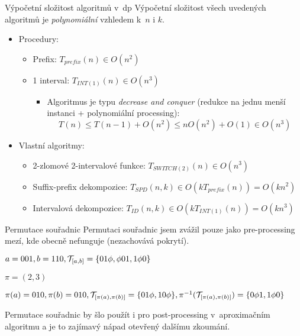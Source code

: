\documentclass{beamer}
\theoremstyle{remark}
\begin{document}
\begin{frame}{Výpočetní složitost algoritmů v~\acrshort{dp}}
Výpočetní složitost všech uvedených algoritmů je \emph{polynomiální} vzhledem k~$n$ i $k$.

\begin{itemize}
\item Procedury:
\begin{itemize}
\item Prefix: $T_{prefix}(n) \in O(n^2)$
\item 1 interval: $T_{INT(1)}(n) \in O(n^3)$
\begin{itemize}
\item
Algoritmus je typu \emph{decrease and conquer} (redukce na jednu menší instanci + polynomiální processing):
$$T(n) \leq T(n-1) + O(n^2) \leq n O(n^2) + O(1) \in O(n^{3})$$
\end{itemize}
\end{itemize}
\item Vlastní algoritmy:
\begin{itemize}
\item 2-zlomové 2-intervalové funkce: $T_{SWITCH(2)}(n) \in O(n^3)$
\item Suffix-prefix dekompozice: $T_{SPD}(n, k) \in O(k T_{prefix}(n)) = O(kn^2)$
\item Intervalová dekompozice: $T_{ID}(n, k) \in O(k T_{INT(1)}(n)) = O(k n^3)$
\end{itemize}
\end{itemize}

\end{frame}


\begin{frame}{Permutace souřadnic}
Permutaci souřadnic jsem zvážil pouze jako pre-processing mezí, kde obecně nefunguje (nezachovává pokrytí).

\begin{example}
$a = 001, b = 110, \mathcal{T}_{[a, b]} = \{01 \phi, \phi 01, 1 \phi 0\}$

$\pi = (2,3)$

$\pi(a) = 010, \pi(b) = 010,
\mathcal{T}_{[\pi(a), \pi(b)]} = \{01 \phi, 10 \phi\},
\pi^{-1}(\mathcal{T}_{[\pi(a), \pi(b)]}) = \{0 \phi 1, 1 \phi 0\}$
\end{example}

Permutace souřadnic by šlo použít i pro post-processing v~aproximačním algoritmu a je to zajímavý nápad otevřený dalšímu zkoumání.

\end{frame}
\end{document}
